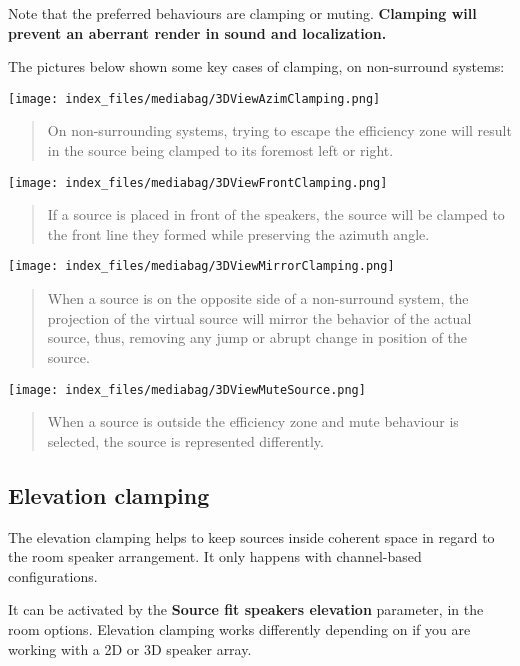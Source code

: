 \documentclass[
  letterpaper,
  DIV=11,
  numbers=noendperiod]{scrreport}
\begin{document}
Note that the preferred behaviours are clamping or muting.
\textbf{Clamping will prevent an aberrant render in sound and
localization.}

The pictures below shown some key cases of clamping, on non-surround
systems:

\texttt{[image: index\_files/mediabag/3DViewAzimClamping.png]}

\begin{quote}
On non-surrounding systems, trying to escape the efficiency zone will
result in the source being clamped to its foremost left or right.
\end{quote}

\texttt{[image: index\_files/mediabag/3DViewFrontClamping.png]}

\begin{quote}
If a source is placed in front of the speakers, the source will be
clamped to the front line they formed while preserving the azimuth
angle.
\end{quote}

\texttt{[image: index\_files/mediabag/3DViewMirrorClamping.png]}

\begin{quote}
When a source is on the opposite side of a non-surround system, the
projection of the virtual source will mirror the behavior of the actual
source, thus, removing any jump or abrupt change in position of the
source.
\end{quote}

\texttt{[image: index\_files/mediabag/3DViewMuteSource.png]}

\begin{quote}
When a source is outside the efficiency zone and mute behaviour is
selected, the source is represented differently.
\end{quote}

\hypertarget{elevation-clamping}{%
\subsection{Elevation clamping}\label{elevation-clamping}}

The elevation clamping helps to keep sources inside coherent space in
regard to the room speaker arrangement. It only happens with
channel-based configurations.

It can be activated by the \textbf{Source fit speakers elevation}
parameter, in the room options. Elevation clamping works differently
depending on if you are working with a 2D or 3D speaker array.
\end{document}
